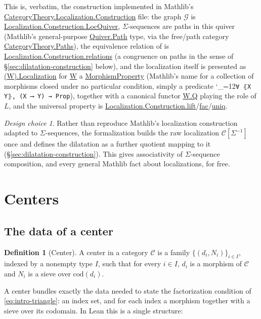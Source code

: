 \documentclass[11pt]{amsart}
\newcommand{\lc}[1]{\url{#1}}
\newcommand{\lcode}{\begingroup\catcode`\_=12\relax\lcodeInner}
\newcommand{\lcodeInner}[1]{\texttt{#1}\endgroup}
\theoremstyle{plain}
\theoremstyle{definition}
\newtheorem{definition}[theorem]{Definition}
\theoremstyle{remark}
\newtheorem*{designchoice}{Design choice}
\newcommand{\calC}{\mathcal C}
\newcommand{\cod}{\mathrm{cod}}
\begin{document}
This is, verbatim, the construction implemented in Mathlib's
\lc{CategoryTheory.Localization.Construction} file: the graph $\mathcal G$ is
\lc{Localization.Construction.LocQuiver}, $\Sigma$-sequences are paths in this quiver
(Mathlib's general-purpose \lc{Quiver.Path} type, via the free/path category
\lc{CategoryTheory.Paths}), the equivalence relation of \citep[Definition~2.4]{Mayeux} is
\lc{Localization.Construction.relations} (a congruence on paths in the sense of
\S\ref{sec:dilatation-construction} below), and the localization itself is presented as
\lc{(W).Localization} for \lc{W} a \lc{MorphismProperty} (Mathlib's name for a collection
of morphisms closed under no particular condition, simply a predicate
\lcode{∀ ⦃X Y⦄, (X ⟶ Y) → Prop}), together with a canonical functor \lc{W.Q} playing the
role of $L$, and the universal property is
\lc{Localization.Construction.lift}/\lc{fac}/\lc{uniq}.

\begin{designchoice}
Rather than reproduce Mathlib's localization construction adapted to $\Sigma$-sequences, the
formalization builds the raw localization $\calC[\Sigma^{-1}]$ once and defines the dilatation
as a further quotient mapping to it (\S\ref{sec:dilatation-construction}). This gives
associativity of $\Sigma$-sequence composition, and every general Mathlib fact about
localizations, for free.
\end{designchoice}

\section{Centers}
\label{sec:centers}

\subsection{The data of a center}

\begin{definition}[Center]
\label{def:center}
A center in a category $\calC$ is a family $\{(d_i,N_i)\}_{i\in I}$, indexed by a
nonempty type $I$, such that for every $i \in I$, $d_i$ is a morphism of $\calC$ and $N_i$
is a sieve over $\cod(d_i)$.
\end{definition}

A center bundles exactly the data needed to state the factorization condition of
\eqref{eq:intro-triangle}: an index set, and for each index a morphism together with a sieve
over its codomain. In Lean this is a single structure:
\end{document}
